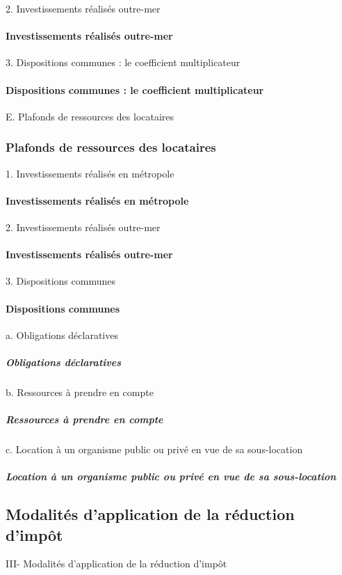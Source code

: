 2. Investissements réalisés outre-mer
				\paragraph{Investissements réalisés outre-mer}


3. Dispositions communes : le coefficient multiplicateur
				\paragraph{Dispositions communes : le coefficient multiplicateur}



E. Plafonds de ressources des locataires
			\subsubsection{Plafonds de ressources des locataires}


1. Investissements réalisés en métropole
				\paragraph{Investissements réalisés en métropole}

2. Investissements réalisés outre-mer
				\paragraph{Investissements réalisés outre-mer}

3. Dispositions communes
				\paragraph{Dispositions communes}


a. Obligations déclaratives
					\subparagraph{Obligations déclaratives}

b. Ressources à prendre en compte
					\subparagraph{Ressources à prendre en compte}

c. Location à un organisme public ou privé en vue de sa sous-location
					\subparagraph{Location à un organisme public ou privé en vue de sa sous-location}


	\subsection{Modalités d’application de la réduction d’impôt}

III- Modalités d’application de la réduction d’impôt

